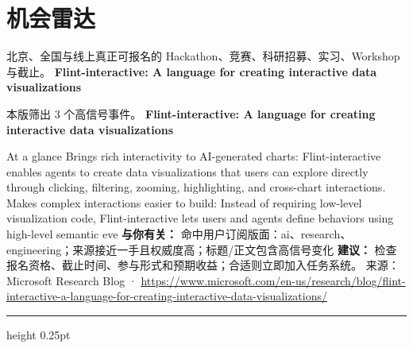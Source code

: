 \documentclass[10.5pt]{ctexart}
\begin{document}
\section*{机会雷达}
{\color{ormuted} 北京、全国与线上真正可报名的 Hackathon、竞赛、科研招募、实习、Workshop 与截止。}
\vspace{2mm}
{\LARGE\bfseries Flint-interactive: A language for creating interactive data visualizations}\par
\vspace{1mm}
{\color{ormuted} 本版筛出 3 个高信号事件。}
\vspace{3mm}
{\Large\bfseries Flint-interactive: A language for creating interactive data visualizations}\par
At a glance Brings rich interactivity to AI-generated charts: Flint-interactive enables agents to create data visualizations that users can explore directly through clicking, filtering, zooming, highlighting, and cross-chart interactions. Makes complex interactions easier to build: Instead of requiring low-level visualization code, Flint-interactive lets users and agents define behaviors using high-level semantic eve
\textbf{与你有关：} 命中用户订阅版面：ai、research、engineering；来源接近一手且权威度高；标题/正文包含高信号变化
\textbf{建议：} 检查报名资格、截止时间、参与形式和预期收益；合适则立即加入任务系统。
{\footnotesize\color{ormuted} 来源：Microsoft Research Blog · \url{https://www.microsoft.com/en-us/research/blog/flint-interactive-a-language-for-creating-interactive-data-visualizations/}}
\vspace{4mm}
\hrule height 0.25pt
\vspace{3mm}
\end{document}
